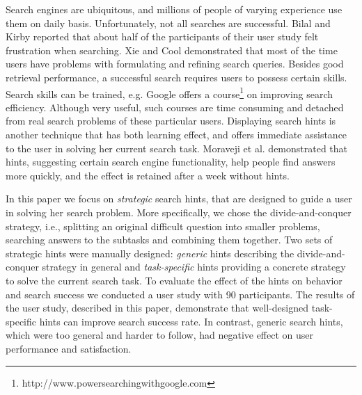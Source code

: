 \documentclass{sig-alternate}
\begin{document}
Search engines are ubiquitous, and millions of people of varying experience use them on daily basis.
Unfortunately, not all searches are successful. Bilal and Kirby \cite{Bilal:2002:DSI:637512.637516} reported that about half of the participants of their user study felt frustration when searching.
Xie and Cool \cite{xie2009understanding} demonstrated that most of the time users have problems with formulating and refining search queries.
Besides good retrieval performance, a successful search requires users to possess certain skills.
Search skills can be trained, e.g. Google offers a course\footnote{http://www.powersearchingwithgoogle.com} on improving search efficiency.
Although very useful, such courses are time consuming and detached from real search problems of these particular users.
Displaying search hints is another technique that has both learning effect, and offers immediate assistance to the user in solving her current search task.
Moraveji et al. \cite{Moraveji:2011:MIU:2009916.2009966} demonstrated that hints, suggesting certain search engine functionality, help people find answers more quickly, and the effect is retained after a week without hints.

In this paper we focus on {\em strategic} search hints, that are designed to guide a user in solving her search problem.
More specifically, we chose the divide-and-conquer strategy, i.e., splitting an original difficult question into smaller problems, searching answers to the subtasks and combining them together.
Two sets of strategic hints were manually designed: {\em generic} hints describing the divide-and-conquer strategy in general and {\em task-specific} hints providing a concrete strategy to solve the current search task.
To evaluate the effect of the hints on behavior and search success we conducted a user study with 90 participants.
The results of the user study, described in this paper, demonstrate that well-designed task-specific hints can improve search success rate.
In contrast, generic search hints, which were too general and harder to follow, had negative effect on user performance and satisfaction.
\end{document}
